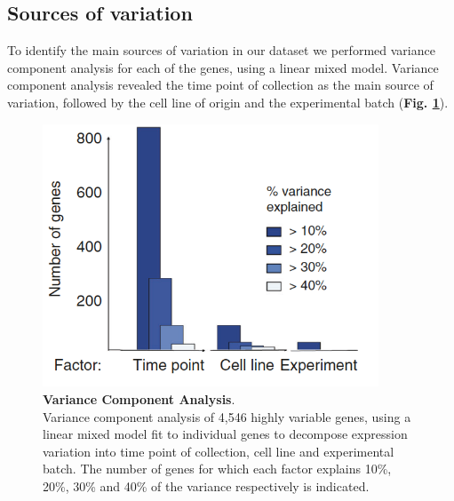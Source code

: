 \newpage

\subsection{Sources of variation} 
\label{sec:endodiff_sources_of_variation}


To identify the main sources of variation in our dataset we performed variance component analysis for each of the genes, using a linear mixed model.
Variance component analysis revealed the time point of collection as the main source of variation, followed by the cell line of origin and the experimental batch (\textbf{Fig. \ref{fig:endodiff_vca}}).\\

\begin{figure}[h]
\includegraphics[width=10cm]{Chapter4/Fig/endodiff_variance_component.png}
\caption[Variance Component Analysis]{\textbf{Variance Component Analysis}.\\
Variance component analysis of 4,546 highly variable genes, using a linear mixed model fit to individual genes to decompose expression variation into
time point of collection, cell line and experimental batch.
The number of genes for which each factor explains 10\%, 20\%, 30\% and 40\% of the variance respectively is indicated.}
\label{fig:endodiff_vca}
\end{figure}

